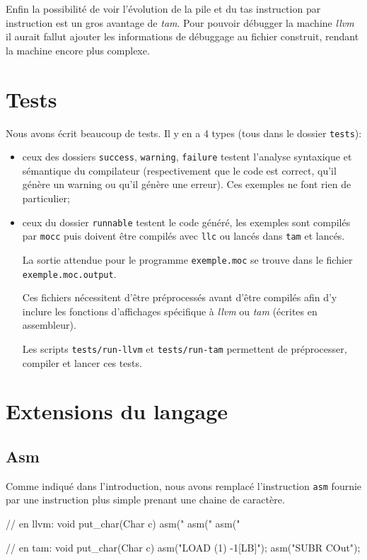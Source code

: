 \documentclass{scrartcl}
\newcommand{\mocc}{\texttt{mocc}}
\newcommand{\llvm}{\textit{llvm}}
\newcommand{\tam} {\textit{tam}}
\begin{document}
  Enfin la possibilité de voir l'évolution de la pile et du tas instruction par
  instruction est un gros avantage de \tam{}. Pour pouvoir débugger la machine
  \llvm{} il aurait fallut ajouter les informations de débuggage au fichier
  construit, rendant la machine encore plus complexe.

\section{Tests}
  Nous avons écrit beaucoup de tests. Il y en a 4 types (tous dans le
  dossier \verb+tests+):
  \begin{itemize}
    \item ceux des dossiers \verb+success+, \verb+warning+, \verb+failure+
      testent l'analyse syntaxique et sémantique du compilateur (respectivement
      que le code est correct, qu'il génère un warning ou qu'il génère une
      erreur). Ces exemples ne font rien de particulier;
    \item ceux du dossier \verb+runnable+ testent le code généré, les exemples
      sont compilés par \mocc{} puis doivent être compilés avec \verb+llc+
      ou lancés dans \verb+tam+ et lancés.

      La sortie attendue pour le programme \verb+exemple.moc+ se trouve dans
      le fichier \verb+exemple.moc.output+.

      Ces fichiers nécessitent d'être préprocessés avant d'être compilés afin
      d'y inclure les fonctions d'affichages spécifique à \llvm{} ou \tam{}
      (écrites en assembleur).

      Les scripts \verb+tests/run-llvm+ et \verb+tests/run-tam+ permettent de
      préprocesser, compiler et lancer ces tests.
  \end{itemize}

\section{Extensions du langage}
  \subsection{Asm}
    Comme indiqué dans l'introduction, nous avons remplacé l'instruction
    \verb+asm+ fournie par une instruction plus simple prenant une chaine de
    caractère.

    \begin{moccode}
// en llvm:
void put_char(Char c) {
    asm("%
    asm("%
    asm("%
}

// en tam:
void put_char(Char c) {
    asm("LOAD (1) -1[LB]");
    asm("SUBR COut");
}
    \end{moccode}
\end{document}

